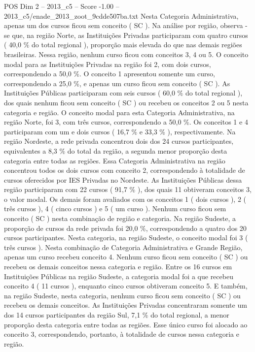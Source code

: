 \begin{textsample}{POS Dim 2 – 2013\_c5 – Score -1.00 – 2013\_c5/enade\_2013\_zoot\_9cdde507ba.txt}
Nesta Categoria Administrativa, apenas um dos cursos ficou sem conceito ( SC ).
Na análise por região, observa -se que, na região Norte, as Instituições Privadas participaram com quatro cursos ( 40,0 \% do total regional ), proporção mais elevada do que nas demais regiões brasileiras.
Nessa região, nenhum curso ficou com conceitos 3, 4 ou 5.
O conceito modal para as Instituições Privadas na região foi 2, com dois cursos, correspondendo a 50,0 \%.
O conceito 1 apresentou somente um curso, correspondendo a 25,0 \%, e apenas um curso ficou sem conceito ( SC ).
As Instituições Públicas participaram com seis cursos ( 60,0 \% do total regional ), dos quais nenhum ficou sem conceito ( SC ) ou recebeu os conceitos 2 ou 5 nesta categoria e região.
O conceito modal para esta Categoria Administrativa, na região Norte, foi 3, com três cursos, correspondendo a 50,0 \%.
Os conceitos 1 e 4 participaram com um e dois cursos ( 16,7 \% e 33,3 \% ), respectivamente.
Na região Nordeste, a rede privada concentrou dois dos 24 cursos participantes, equivalentes a 8,3 \% do total da região, a segunda menor proporção desta categoria entre todas as regiões.
Essa Categoria Administrativa na região concentrou todos os dois cursos com conceito 2, correspondendo à totalidade de cursos oferecidos por IES Privadas no Nordeste.
As Instituições Públicas dessa região participaram com 22 cursos ( 91,7 \% ), dos quais 11 obtiveram conceitos 3, o valor modal.
Os demais foram avaliados com os conceitos 1 ( dois cursos ), 2 ( três cursos ), 4 ( cinco cursos ) e 5 ( um curso ).
Nenhum curso ficou sem conceito ( SC ) nesta combinação de região e categoria.
Na região Sudeste, a proporção de cursos da rede privada foi 20,0 \%, correspondendo a quatro dos 20 cursos participantes.
Nesta categoria, na região Sudeste, o conceito modal foi 3 ( três cursos ).
Nesta combinação de Categoria Administrativa e Grande Região, apenas um curso recebeu conceito 4.
Nenhum curso ficou sem conceito ( SC ) ou recebeu os demais conceitos nessa categoria e região.
Entre os 16 cursos em Instituições Públicas na região Sudeste, a categoria modal foi a que recebeu conceito 4 ( 11 cursos ), enquanto cinco cursos obtiveram conceito 5.
E também, na região Sudeste, nesta categoria, nenhum curso ficou sem conceito ( SC ) ou recebeu os demais conceitos.
As Instituições Privadas concentraram somente um dos 14 cursos participantes da região Sul, 7,1 \% do total regional, a menor proporção desta categoria entre todas as regiões.
Esse único curso foi alocado ao conceito 3, correspondendo, portanto, à totalidade de cursos nessa categoria e região.

\end{textsample}
